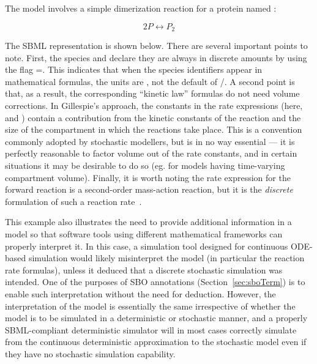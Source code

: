 The model involves a simple dimerization reaction for a protein
named :
\begin{linenomath}
\begin{equation*}
    2 P  \leftrightarrow  P_2
\end{equation*}
\end{linenomath}
The SBML representation is shown below.  There are several
important points to note.  First, the species  and 
declare they are always in discrete amounts by using the flag
=.  This indicates that
when the species identifiers appear in mathematical formulas, the
units are , not the default of
/.  A second point is that, as
a result, the corresponding ``kinetic law'' formulas do not need
volume corrections.  In Gillespie's approach, the constants in the
rate expressions (here,  and ) contain a
contribution from the kinetic constants of the reaction and the
size of the compartment in which the reactions take
place. This is a convention commonly adopted by stochastic
modellers, but is in no way essential --- it is perfectly
reasonable to factor volume out of the rate constants, and in
certain situations it may be desirable to do so (eg. for models having
time-varying compartment volume).
Finally, it is worth noting the rate expression for the forward
reaction is a second-order mass-action reaction, but it is the
\emph{discrete} formulation of such a reaction
rate~\citep{gillespie:1977}.


This example also illustrates the need to provide additional
information in a model so that software tools using different
mathematical frameworks can properly interpret it.  In this case,
a simulation tool designed for continuous ODE-based simulation
would likely misinterpret the model (in particular the reaction
rate formulas), unless it deduced that a discrete stochastic
simulation was intended.  One of the purposes of SBO annotations
(Section~\ref{sec:sboTerm}) is to enable such interpretation
without the need for deduction. However, the interpretation of the
model is essentially the same irrespective of whether the model is
to be simulated in a deterministic or stochastic manner, and a
properly SBML-compliant deterministic simulator will in most cases
correctly simulate from the continuous deterministic approximation
to the stochastic model even if they have no stochastic simulation
capability.

